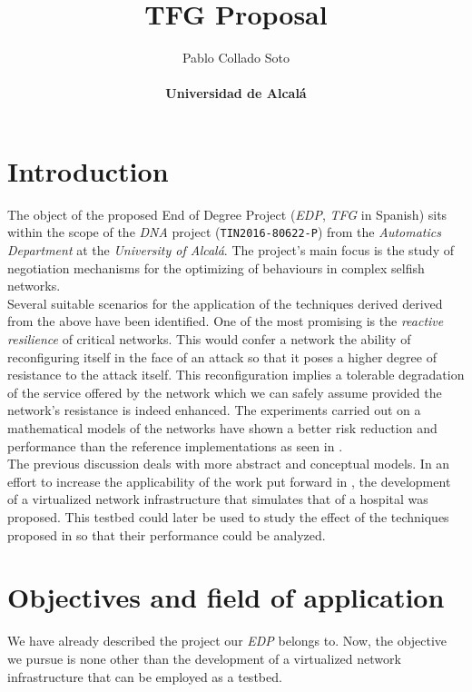 \documentclass[12pt]{article}
\title{\vspace{-1cm}TFG Proposal}
\author{Pablo Collado Soto \\ \\ \textbf{Universidad de Alcalá}}
\date{}
\begin{document}
    \maketitle

    \section{Introduction}
        The object of the proposed End of Degree Project (\textit{EDP}, \textit{TFG} in Spanish) sits within the scope of the \textit{DNA} project (\texttt{TIN2016-80622-P}) from the \textit{Automatics Department} at the \textit{University of Alcalá}. The project's main focus is the study of negotiation mechanisms for the optimizing of behaviours in complex selfish networks.\\

        Several suitable scenarios for the application of the techniques derived derived from the above have been identified. One of the most promising is the \textit{reactive resilience} of critical networks. This would confer a network the ability of reconfiguring itself in the face of an attack so that it poses a higher degree of resistance to the attack itself. This reconfiguration implies a tolerable degradation of the service offered by the network which we can safely assume provided the network's resistance is indeed enhanced. The experiments carried out on a mathematical models of the networks have shown a better risk reduction and performance than the reference implementations as seen in \cite{bib:REACT}.\\

        The previous discussion deals with more abstract and conceptual models. In an effort to increase the applicability of the work put forward in \cite{bib:REACT}, the development of a virtualized network infrastructure that simulates that of a hospital was proposed. This testbed could later be used to study the effect of the techniques proposed in \cite{bib:REACT} so that their performance could be analyzed.\\

    \section{Objectives and field of application}
        We have already described the project our \textit{EDP} belongs to. Now, the objective we pursue is none other than the development of a virtualized network infrastructure that can be employed as a testbed.\\
\end{document}
